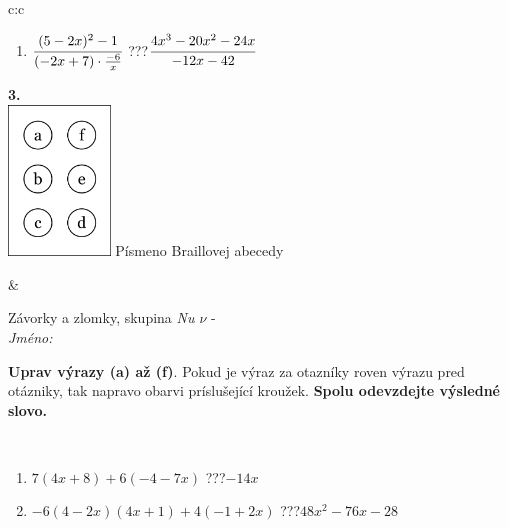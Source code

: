 \documentclass[10pt]{report}
\begin{document}
\begin{tabular}{c:c}
\begin{minipage}[c][104.5mm][t]{0.5\linewidth}
\begin{center}
\begin{minipage}{0.79\linewidth}
\begin{center}
\begin{varwidth}{\linewidth}
\begin{enumerate}
\item $\cfrac{(5-2x)^2-1}{(-2x+7)\cdot\frac{-6}{x}}$\quad \dotfill\; ???\;\dotfill \quad $\cfrac{4x^3-20x^2-24x}{-12x-42}$
\end{enumerate}
\end{varwidth}
\end{center}
\end{minipage}
\begin{minipage}{0.20\linewidth}
\begin{center}
{\Huge\bfseries 3.} \\[2mm]
\includegraphics[height=40mm]{../images/braille.png}
{\small Písmeno Braillovej abecedy}
\end{center}
\end{minipage}
\end{center}
\end{minipage}
&
\begin{minipage}[c][104.5mm][t]{0.5\linewidth}
\begin{center}
\vspace{7mm}
{\huge Závorky a zlomky, skupina \textit{Nu $\nu$} -}\\[5mm]
\textit{Jméno:}\phantom{xxxxxxxxxxxxxxxxxxxxxxxxxxxxxxxxxxxxxxxxxxxxxxxxxxxxxxxxxxxxxxxxx}\\[5mm]
\begin{minipage}{0.95\linewidth}
\begin{center}
\textbf{Uprav výrazy (a) až (f)}. Pokud je výraz za otazníky roven výrazu pred otázniky, tak napravo obarvi príslušející kroužek. \textbf{Spolu odevzdejte výsledné slovo.}
\end{center}
\end{minipage}
\\[1mm]
\begin{minipage}{0.79\linewidth}
\begin{center}
\begin{varwidth}{\linewidth}
\begin{enumerate}
\normalsize
\item $7(4x+8)+6(-4-7x)$\quad \dotfill\; ???\;\dotfill \quad $-14x$
\item $-6(4-2x)(4x+1)+4(-1+2x)$\quad \dotfill\; ???\;\dotfill \quad $48x^2-76x-28$

\end{enumerate}
\end{varwidth}
\end{center}
\end{minipage}
\end{center}
\end{minipage}
\end{tabular}
\end{document}
